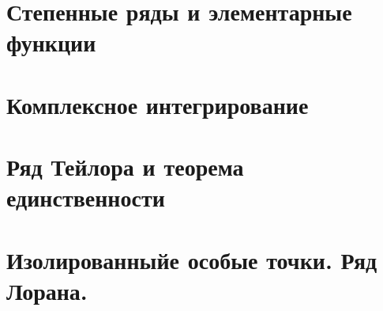 


% 

\setcounter{section}{2}
\section{Степенные ряды и элементарные функции}


\section{Комплексное интегрирование}


\section{Ряд Тейлора и теорема единственности}


\section{Изолированныйе особые точки. Ряд Лорана.}
